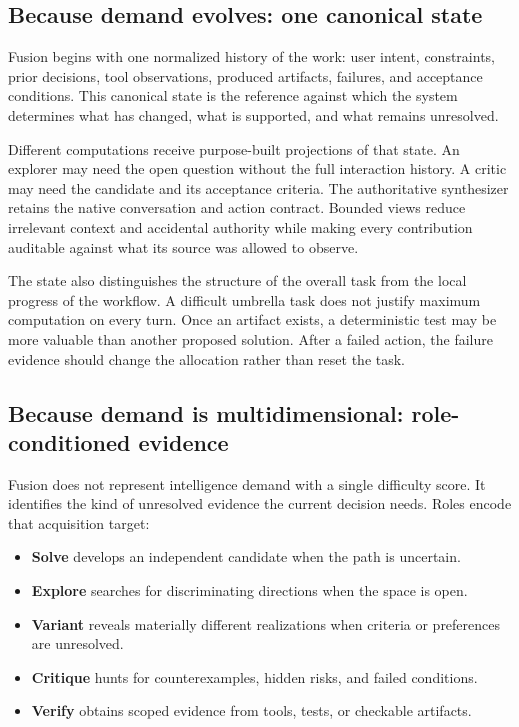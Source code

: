\subsection{Because demand evolves: one canonical state}

Fusion begins with one normalized history of the work: user intent,
constraints, prior decisions, tool observations, produced artifacts, failures,
and acceptance conditions. This canonical state is the reference against which
the system determines what has changed, what is supported, and what remains
unresolved.

Different computations receive purpose-built projections of that state. An
explorer may need the open question without the full interaction history. A
critic may need the candidate and its acceptance criteria. The authoritative
synthesizer retains the native conversation and action contract. Bounded views
reduce irrelevant context and accidental authority while making every
contribution auditable against what its source was allowed to observe.

The state also distinguishes the structure of the overall task from the local
progress of the workflow. A difficult umbrella task does not justify maximum
computation on every turn. Once an artifact exists, a deterministic test may be
more valuable than another proposed solution. After a failed action, the
failure evidence should change the allocation rather than reset the task.

\subsection{Because demand is multidimensional: role-conditioned evidence}

Fusion does not represent intelligence demand with a single difficulty score.
It identifies the kind of unresolved evidence the current decision needs.
Roles encode that acquisition target:

\begin{itemize}
  \item \textbf{Solve} develops an independent candidate when the path is uncertain.
  \item \textbf{Explore} searches for discriminating directions when the space is open.
  \item \textbf{Variant} reveals materially different realizations when criteria or preferences are unresolved.
  \item \textbf{Critique} hunts for counterexamples, hidden risks, and failed conditions.
  \item \textbf{Verify} obtains scoped evidence from tools, tests, or checkable artifacts.
\end{itemize}

